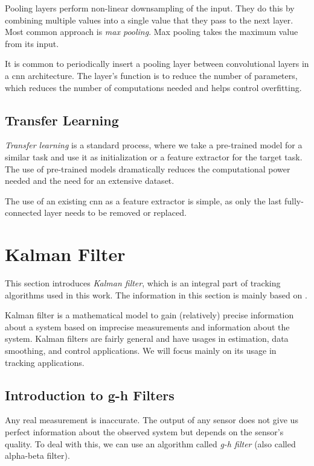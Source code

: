 Pooling layers perform non-linear downsampling of the input. They do this by combining multiple values into a single value that they pass to the next layer. Most common approach is \textit{max pooling}. Max pooling takes the maximum value from its input.

It is common to periodically insert a pooling layer between convolutional layers in a \gls{cnn} architecture. The layer's function is to reduce the number of parameters, which reduces the number of computations needed and helps control overfitting.

\subsection{Transfer Learning}

\textit{Transfer learning} is a standard process, where we take a pre-trained model for a similar task and use it as initialization or a feature extractor for the target task. The use of pre-trained models dramatically reduces the computational power needed and the need for an extensive dataset.

The use of an existing \gls{cnn} as a feature extractor is simple, as only the last fully-connected layer needs to be removed or replaced.

\section{Kalman Filter}\label{s:kalman}

This section introduces \textit{Kalman filter}, which is an integral part of tracking algorithms used in this work. The information in this section is mainly based on \cite{labbe2014}.

Kalman filter is a mathematical model to gain (relatively) precise information about a system based on imprecise measurements and information about the system. Kalman filters are fairly general and have usages in estimation, data smoothing, and control applications. We will focus mainly on its usage in tracking applications.

\subsection{Introduction to g-h Filters}

Any real measurement is inaccurate. The output of any sensor does not give us perfect information about the observed system but depends on the sensor's quality. To deal with this, we can use an algorithm called \textit{g-h filter} (also called alpha-beta filter).

